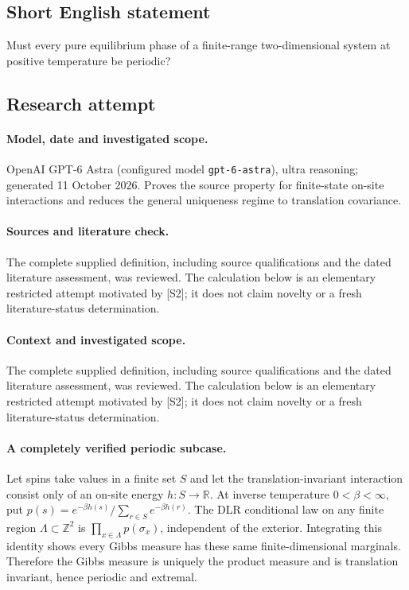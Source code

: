 \documentclass[11pt]{article}
\begin{document}
\subsection{Short English statement}
Must every pure equilibrium phase of a finite-range two-dimensional system at positive temperature be periodic?
\subsection{Research attempt}
\paragraph{Model, date and investigated scope.}
OpenAI GPT-6 Astra (configured model \texttt{gpt-6-astra}), ultra reasoning; generated 11 October 2026. Proves the source property for finite-state on-site interactions and reduces the general uniqueness regime to translation covariance.

\paragraph{Sources and literature check.}
The complete supplied definition, including source qualifications and the dated literature assessment, was reviewed. The calculation below is an elementary restricted attempt motivated by [S2]; it does not claim novelty or a fresh literature-status determination.

\paragraph{Context and investigated scope.} The complete supplied definition, including source qualifications and the dated literature assessment, was reviewed. The calculation below is an elementary restricted attempt motivated by [S2]; it does not claim novelty or a fresh literature-status determination.

\paragraph{A completely verified periodic subcase.} Let spins take values in a finite set $S$ and let the translation-invariant interaction consist only of an on-site energy $h:S\to\mathbb R$. At inverse temperature $0<\beta<\infty$, put $p(s)=e^{-\beta h(s)}/\sum_{r\in S}e^{-\beta h(r)}$. The DLR conditional law on any finite region $\Lambda\subset\mathbb Z^2$ is $\prod_{x\in\Lambda}p(\sigma_x)$, independent of the exterior. Integrating this identity shows every Gibbs measure has these same finite-dimensional marginals. Therefore the Gibbs measure is uniquely the product measure and is translation invariant, hence periodic and extremal.
\end{document}
